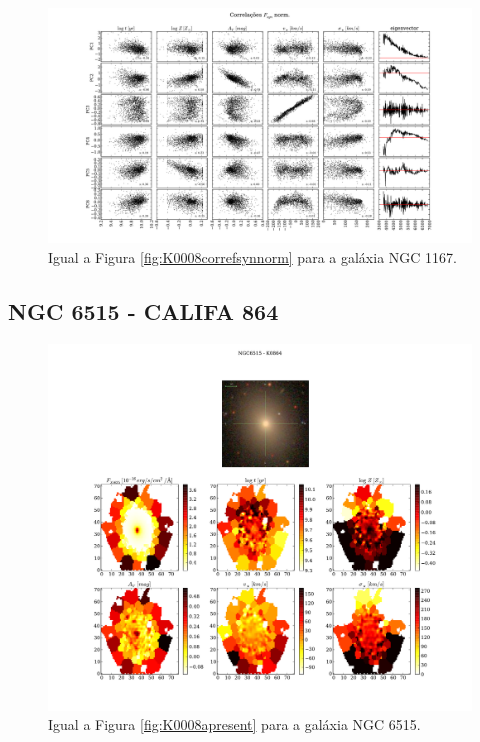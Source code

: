 \begin{figure}
    \includegraphics[width=1.3\textwidth, angle=-90]{figuras/K0119-correl-f_syn_norm-PCvsPhys.pdf}
	\caption[Correlações PCs vs. par\^ametros f\'isicos - $F_{syn}$ norm. - NGC 1167.]
	{Igual a Figura \ref{fig:K0008correfsynnorm} para a galáxia NGC 1167.}
    \label{fig:K0119correfsynnorm}
\end{figure}

\subsection{NGC 6515 - CALIFA 864}

\begin{figure}
    \includegraphics[width=1.\textwidth]{figuras/K0864-apresent.pdf}
    \caption[Propriedades f\'isicas da gal\'axia NGC 6515.]
    {Igual a Figura \ref{fig:K0008apresent} para a galáxia NGC 6515.}
    \label{fig:K0864apresent}
\end{figure}

